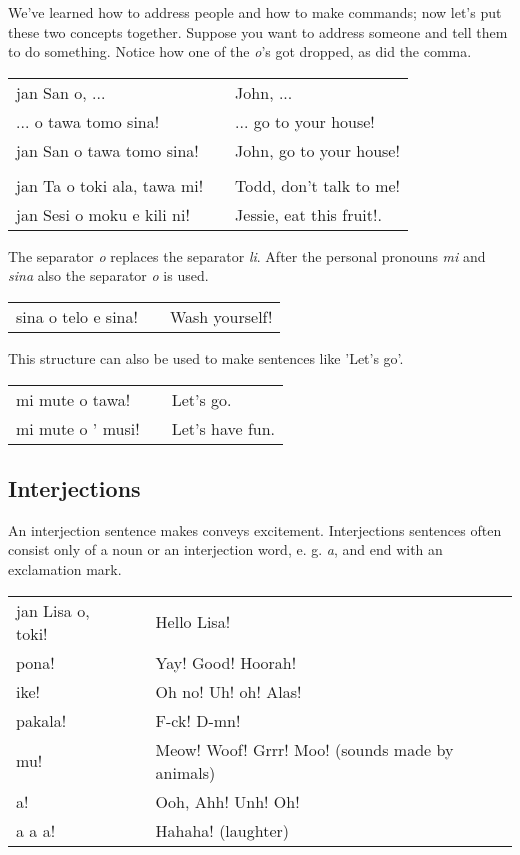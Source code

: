 We've learned how to address people and how to make commands; now let's put these two concepts together. 
Suppose you want to address someone and tell them to do something. 
Notice how one of the \textit{o}'s got dropped, as did the comma. 

\begin{supertabular}{p{5,5cm}|ll}
jan San o, ...  && John, ... \\ %
 ... o tawa tomo sina! && ... go to your house! \\ %
jan San o tawa tomo sina!  && John, go to your house! \\
 && \\ %
jan Ta o toki ala, tawa mi! && Todd, don't talk to me! \\
jan Sesi o moku e kili ni! && Jessie, eat this fruit!. \\
\end{supertabular} 

The separator \textit{o} replaces the separator \textit{li}. 
After the personal pronouns \textit{mi} and \textit{sina} also the separator \textit{o} is used. 

\begin{supertabular}{p{5,5cm}|ll}
sina o telo e sina! && Wash yourself! \\
\end{supertabular} 

This structure can also be used to make sentences like 'Let's go'.

\begin{supertabular}{p{5,5cm}|ll}
mi mute o tawa! && Let's go. \\
mi mute o ' musi! && Let's have fun. \\
\end{supertabular} 
%
\subsection*{Interjections}
%
%
An interjection sentence makes conveys excitement.
Interjections sentences often consist only of a noun or an interjection word, e. g. \textit{a}, and end with an exclamation mark.

\begin{supertabular}{p{5,5cm}|ll}
jan Lisa o, toki! && Hello Lisa! \\
pona! && Yay! Good! Hoorah! \\
ike! && Oh no! Uh! oh! Alas! \\
pakala! && F-ck! D-mn! \\
mu! && Meow! Woof! Grrr! Moo! (sounds made by animals) \\
a! && Ooh, Ahh! Unh! Oh! \\
a a a! && Hahaha! (laughter) \\
\end{supertabular} 

